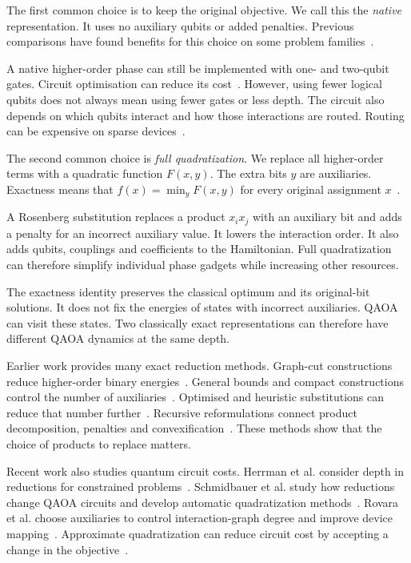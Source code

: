 \documentclass[a4paper,onecolumn,11pt,unpublished]{quantumarticle}
\theoremstyle{remark}
\begin{document}
The first common choice is to keep the original objective. We call this the
\emph{native} representation. It uses no auxiliary qubits or added penalties.
Previous comparisons have found benefits for this choice on some problem
families~\cite{Glos2022,CampbellDahl2022,Stein2023,Bell2025}.

A native higher-order phase can still be implemented with one- and two-qubit
gates. Circuit optimisation can reduce its cost~\cite{Verchere2023}.
However, using fewer logical qubits does not always mean using fewer gates
or less depth. The circuit also depends on which qubits interact and how
those interactions are routed. Routing can be expensive on sparse
devices~\cite{Weidenfeller2022,Harrigan2021}.

The second common choice is \emph{full quadratization}. We replace all
higher-order terms with a quadratic function $F(x,y)$. The extra bits $y$
are auxiliaries. Exactness means that $f(x)=\min_y F(x,y)$ for every original
assignment $x$~\cite{Rosenberg1975,BorosGruber2014,Dattani2019}.

A Rosenberg substitution replaces a product $x_i x_j$ with an auxiliary bit
and adds a penalty for an incorrect auxiliary value. It lowers the
interaction order. It also adds qubits, couplings and coefficients to the
Hamiltonian. Full quadratization can therefore simplify individual phase
gadgets while increasing other resources.

The exactness identity preserves the classical optimum and its original-bit
solutions. It does not fix the energies of states with incorrect auxiliaries.
QAOA can visit these states. Two classically exact representations can
therefore have different QAOA dynamics at the same depth.

Earlier work provides many exact reduction methods. Graph-cut constructions
reduce higher-order binary energies~\cite{FreedmanDrineas2005,Ishikawa2011}.
General bounds and compact constructions control the number of
auxiliaries~\cite{AnthonyEtAl2017,Anthony2016,BorosCramaRodriguezHeck2020}.
Optimised and heuristic substitutions can reduce that number
further~\cite{VermaLewis2020,VermaLewisKochenberger2021}. Recursive
reformulations connect product decomposition, penalties and
convexification~\cite{CramaEtAl2025}. These methods show that the choice of
products to replace matters.

Recent work also studies quantum circuit costs. Herrman et al. consider
depth in reductions for constrained problems~\cite{Herrman2021}.
Schmidbauer et al. study how reductions change QAOA circuits and develop
automatic quadratization methods~\cite{Schmidbauer2024,Schmidbauer2026}.
Rovara et al. choose auxiliaries to control interaction-graph degree and
improve device mapping~\cite{Rovara2026}. Approximate quadratization can
reduce circuit cost by accepting a change in the objective~\cite{Dragoi2026}.
\end{document}

